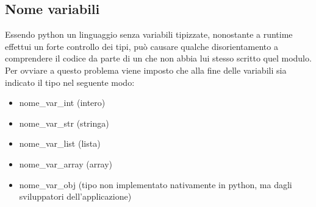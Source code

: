 	\subsection{Nome variabili} %
	\label{sub:nome_variabili}
	Essendo python un linguaggio senza variabili tipizzate, nonostante a runtime effettui un forte controllo dei tipi, può causare qualche disorientamento a comprendere il codice da parte di un \roleProgrammer{} che non abbia lui stesso scritto quel modulo. Per ovviare a questo problema viene imposto che alla fine delle variabili sia indicato il tipo nel seguente modo:
		\begin{itemize}
			\item nome\_var\_int (intero)
			\item nome\_var\_str (stringa)
			\item nome\_var\_list (lista)
			\item nome\_var\_array (array)
			\item nome\_var\_obj (tipo non implementato nativamente in python, ma dagli sviluppatori dell'applicazione)
		\end{itemize}

